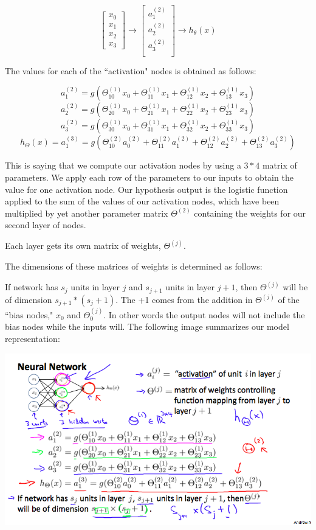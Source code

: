 \documentclass[UTF8]{article}
\begin{document}
\[\begin{bmatrix}x_0 \\ x_1 \\ x_2 \\ x_3\end{bmatrix}\rightarrow\begin{bmatrix}a_1^{(2)} \\ a_2^{(2)} \\ a_3^{(2)} \\ \end{bmatrix}\rightarrow h_\theta(x)\]

The values for each of the ``activation" nodes is obtained as follows:

\[a_1^{(2)} = g(\Theta_{10}^{(1)}x_0 + \Theta_{11}^{(1)}x_1 + \Theta_{12}^{(1)}x_2 + \Theta_{13}^{(1)}x_3) \]
\[ a_2^{(2)} = g(\Theta_{20}^{(1)}x_0 + \Theta_{21}^{(1)}x_1 + \Theta_{22}^{(1)}x_2 + \Theta_{23}^{(1)}x_3) \]
\[ a_3^{(2)} = g(\Theta_{30}^{(1)}x_0 + \Theta_{31}^{(1)}x_1 + \Theta_{32}^{(1)}x_2 + \Theta_{33}^{(1)}x_3) \]
\[ h_\Theta(x) = a_1^{(3)} = g(\Theta_{10}^{(2)}a_0^{(2)} + \Theta_{11}^{(2)}a_1^{(2)} + \Theta_{12}^{(2)}a_2^{(2)} + \Theta_{13}^{(2)}a_3^{(2)}) \]

This is saying that we compute our activation nodes by using a $3*4$ matrix of parameters. We apply each row of the parameters to our inputs to obtain the value for one activation node. Our hypothesis output is the logistic function applied to the sum of the values of our activation nodes, which have been multiplied by yet another parameter matrix $\Theta^{(2)}$ containing the weights for our second layer of nodes.

Each layer gets its own matrix of weights, $\Theta^{(j)}$.

The dimensions of these matrices of weights is determined as follows:

If network has $s_j$ units in layer $j$ and $s_{j+1}$ units in layer $j+1$, then $\Theta^{(j)}$ will be of dimension $s_{j+1}*(s_j+1)$.
The +1 comes from the addition in $\Theta^{(j)}$ of the ``bias nodes," $x_0$ and $\Theta^{(j)}_0$. In other words the output nodes will not include the bias nodes while the inputs will. The following image summarizes our model representation:

\includegraphics[width = .8\textwidth]{NotePics/8_1_1.png}
\end{document}
